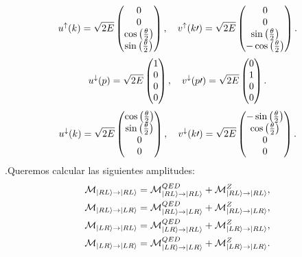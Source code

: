 \documentclass{article}
\theoremstyle{plain}
\theoremstyle{definition}
\begin{document}
	\[
	u^\uparrow(k) = \sqrt{2E}\left(\begin{array}{@{}c@{}}
	0\\
	0\\
	\cos\left(\frac{\theta}{2}\right)\\
	\sin\left(\frac{\theta}{2}\right)\end{array}\right),
	\quad 
	v^\uparrow(k\prime) = \sqrt{2E}\left(\begin{array}{@{}c@{}}
	0\\
	0\\
	\sin\left(\frac{\theta}{2}\right)\\
	-\cos\left(\frac{\theta}{2}\right)\end{array}\right)\text{.}
	\]
	\[
	u^\downarrow(p) = \sqrt{2E}\left(\begin{array}{@{}c@{}}
	1\\
	0\\
	0\\
	0
	\end{array}\right),
	\quad 
	v^\downarrow(p\prime) = \sqrt{2E}
	\left(\begin{array}{@{}c@{}}
	0\\
	1\\
	0\\
	0
	\end{array}\right)\text{.}
	\]
	\[
	u^\downarrow(k) = \sqrt{2E}\left(\begin{array}{@{}c@{}}
	\cos\left(\frac{\theta}{2}\right)\\
	\sin\left(\frac{\theta}{2}\right)\\
	0\\
	0
	\end{array}\right),
	\quad 
	v^\downarrow(k\prime) = \sqrt{2E}\left(\begin{array}{@{}c@{}}
	-\sin\left(\frac{\theta}{2}\right)\\
	\cos\left(\frac{\theta}{2}\right)\\
	0\\
	0
	\end{array}\right)\text{.}
	\]
	.Queremos calcular las siguientes amplitudes: 
	\begin{equation}\label{Amplitudes}
	\begin{gathered}	
\mathcal{M}_{\ket{RL}\rightarrow \ket{RL}} = \mathcal{M}^{QED}_{\ket{RL}\rightarrow \ket{RL}} + \mathcal{M}^{Z}_{\ket{RL}\rightarrow \ket{RL}},\\
\mathcal{M}_{\ket{RL}\rightarrow \ket{LR}} = \mathcal{M}^{QED}_{\ket{RL}\rightarrow \ket{LR}} + \mathcal{M}^{Z}_{\ket{RL}\rightarrow \ket{LR}}, \\
\mathcal{M}_{\ket{LR}\rightarrow \ket{RL}} = \mathcal{M}^{QED}_{\ket{LR}\rightarrow \ket{RL}} + \mathcal{M}^{Z}_{\ket{LR}\rightarrow \ket{RL}},\\
\mathcal{M}_{\ket{LR}\rightarrow \ket{LR}} = \mathcal{M}^{QED}_{\ket{LR}\rightarrow \ket{LR}} + \mathcal{M}^{Z}_{\ket{LR}\rightarrow \ket{LR}}\text{.}
	\end{gathered}
	\end{equation}
\end{document}
